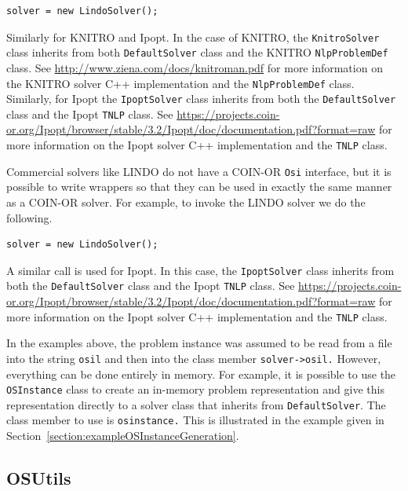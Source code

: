\documentclass[11pt]{article}
\renewcommand{\_}{{\char"5F}}
\renewcommand{\{}{{\char"7B}}
\renewcommand{\}}{{\char"7D}}
\renewcommand{\^}{{\char"0D}}
\renewcommand{\'}{{\char"0D}}
\begin{document}
\begin{enumerate}[Step 1:]
\begin{verbatim}
solver = new LindoSolver();
\end{verbatim}

Similarly for KNITRO and Ipopt. In the case of  KNITRO, the {\tt KnitroSolver} class inherits from both 
{\tt DefaultSolver} class and the KNITRO {\tt NlpProblemDef} class. See \url{http://www.ziena.com/docs/knitroman.pdf} 
for more information on the KNITRO solver C++ implementation and the {\tt NlpProblemDef} class. 
Similarly, for Ipopt the {\tt IpoptSolver} class inherits from both the  {\tt DefaultSolver} class and the Ipopt 
{\tt TNLP} class.  See \url{https://projects.coin-or.org/Ipopt/browser/stable/3.2/Ipopt/doc/documentation.pdf?format=raw} 
for more information on the Ipopt solver C++ implementation and the {\tt TNLP} class.

\else

Commercial solvers like LINDO do not have a COIN-OR {\tt Osi} interface, but it is possible to 
write wrappers so that they can be used in exactly the same manner as a COIN-OR solver. For example, to invoke the 
LINDO solver we do the following.

\begin{verbatim}
solver = new LindoSolver();
\end{verbatim}

A similar call is used for Ipopt. In this case, the {\tt IpoptSolver} class inherits from both the  
{\tt DefaultSolver} class and the Ipopt {\tt TNLP} class.  
See \url{https://projects.coin-or.org/Ipopt/browser/stable/3.2/Ipopt/doc/documentation.pdf?format=raw} 
for more information on the Ipopt solver C++ implementation and the {\tt TNLP} class.
\fi         %


In the examples above,  the problem instance was assumed to be read from a file into the string {\tt osil} 
and then into the class member {\tt solver->osil.} However, everything can be done entirely in memory. 
For example, it is possible to use the {\tt OSInstance} class to create 
an in-memory problem representation and give this representation directly to a solver class that inherits 
from {\tt DefaultSolver}. The class member to use is {\tt osinstance.} This is illustrated in the example 
given in Section~\ref{section:exampleOSInstanceGeneration}.


\subsection{OSUtils}


\end{enumerate}
\end{document}
